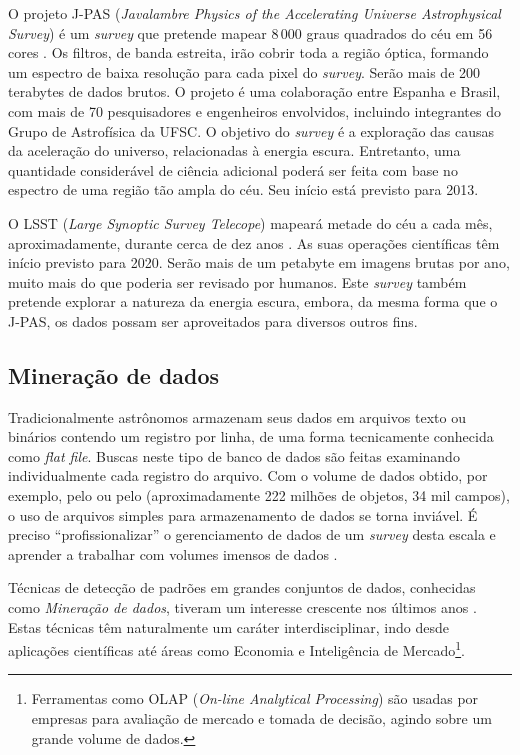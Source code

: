 O projeto J-PAS ({\em Javalambre Physics of the Accelerating Universe
Astrophysical Survey}) é um {\em survey} que pretende mapear $8\,000$ graus
quadrados do céu em 56 cores \citep{Benitez2009}. Os filtros, de banda estreita,
irão cobrir toda a região óptica, formando um espectro de baixa resolução para
cada pixel do {\em survey}. Serão mais de 200 terabytes de dados brutos. O
projeto é uma colaboração entre Espanha e Brasil, com mais de 70 pesquisadores e
engenheiros envolvidos, incluindo integrantes do Grupo de Astrofísica da UFSC. O
objetivo do {\em survey} é a exploração das causas da aceleração do universo,
relacionadas à energia escura. Entretanto, uma quantidade considerável de
ciência adicional poderá ser feita com base no espectro de uma região tão ampla
do céu. Seu início está previsto para 2013.

O LSST ({\em Large Synoptic Survey Telecope}) mapeará metade do céu a cada mês,
aproximadamente, durante cerca de dez anos \citep{Ivezic2008}. As suas operações
científicas têm início previsto para 2020. Serão mais de um petabyte em imagens
brutas por ano, muito mais do que poderia ser revisado por humanos. Este {\em
survey} também pretende explorar a natureza da energia escura, embora, da mesma
forma que o J-PAS, os dados possam ser aproveitados para diversos outros fins.

\subsection{Mineração de dados}

Tradicionalmente astrônomos armazenam seus dados em arquivos texto ou binários
contendo um registro por linha, de uma forma tecnicamente conhecida como {\em
flat file}. Buscas neste tipo de banco de dados são feitas examinando
individualmente cada registro do arquivo. Com o volume de dados obtido, por
exemplo, pelo \SDSS ou pelo \galex (aproximadamente 222 milhões de objetos, 34
mil campos), o uso de arquivos simples para armazenamento de dados se torna
inviável. É preciso ``profissionalizar'' o gerenciamento de dados de um {\em
survey} desta escala e aprender a trabalhar com volumes imensos de dados
\citep{Bell2006}.

Técnicas de detecção de padrões em grandes conjuntos de dados, conhecidas como
{\em Mineração de dados}, tiveram um interesse crescente nos últimos anos
\citep{SIGKDD2011}. Estas técnicas têm naturalmente um caráter interdisciplinar,
indo desde aplicações científicas até áreas como Economia \citep{Spanos2000} e
Inteligência de Mercado\footnote{Ferramentas como OLAP ({\em On-line Analytical
Processing}) são usadas por empresas para avaliação de mercado e tomada de
decisão, agindo sobre um grande volume de dados.}.

